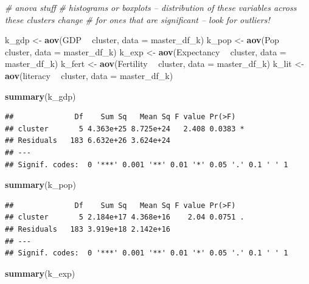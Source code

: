 \documentclass[]{article}
\newenvironment{Shaded}{\begin{snugshade}}{\end{snugshade}}
\newcommand{\CommentTok}[1]{\textcolor[rgb]{0.56,0.35,0.01}{\textit{#1}}}
\newcommand{\DataTypeTok}[1]{\textcolor[rgb]{0.13,0.29,0.53}{#1}}
\newcommand{\KeywordTok}[1]{\textcolor[rgb]{0.13,0.29,0.53}{\textbf{#1}}}
\newcommand{\NormalTok}[1]{#1}
\newcommand{\OperatorTok}[1]{\textcolor[rgb]{0.81,0.36,0.00}{\textbf{#1}}}
\newcommand{\StringTok}[1]{\textcolor[rgb]{0.31,0.60,0.02}{#1}}
\begin{document}
\begin{Shaded}
\begin{Highlighting}[]
\CommentTok{# anova stuff}
\CommentTok{# histograms or boxplots -- distribution of these variables across these clusters change}
\CommentTok{# for ones that are significant -- look for outliers!}

\NormalTok{k_gdp <-}\StringTok{ }\KeywordTok{aov}\NormalTok{(GDP }\OperatorTok{~}\StringTok{ }\NormalTok{cluster, }\DataTypeTok{data =}\NormalTok{ master_df_k)}
\NormalTok{k_pop <-}\StringTok{ }\KeywordTok{aov}\NormalTok{(Pop }\OperatorTok{~}\StringTok{ }\NormalTok{cluster, }\DataTypeTok{data =}\NormalTok{ master_df_k) }
\NormalTok{k_exp <-}\StringTok{ }\KeywordTok{aov}\NormalTok{(Expectancy }\OperatorTok{~}\StringTok{ }\NormalTok{cluster, }\DataTypeTok{data =}\NormalTok{ master_df_k) }
\NormalTok{k_fert <-}\StringTok{ }\KeywordTok{aov}\NormalTok{(Fertility }\OperatorTok{~}\StringTok{ }\NormalTok{cluster, }\DataTypeTok{data =}\NormalTok{ master_df_k) }
\NormalTok{k_lit <-}\StringTok{ }\KeywordTok{aov}\NormalTok{(literacy }\OperatorTok{~}\StringTok{ }\NormalTok{cluster, }\DataTypeTok{data =}\NormalTok{ master_df_k) }

\KeywordTok{summary}\NormalTok{(k_gdp)}
\end{Highlighting}
\end{Shaded}

\begin{verbatim}
##              Df    Sum Sq   Mean Sq F value Pr(>F)  
## cluster       5 4.363e+25 8.725e+24   2.408 0.0383 *
## Residuals   183 6.632e+26 3.624e+24                 
## ---
## Signif. codes:  0 '***' 0.001 '**' 0.01 '*' 0.05 '.' 0.1 ' ' 1
\end{verbatim}

\begin{Shaded}
\begin{Highlighting}[]
\KeywordTok{summary}\NormalTok{(k_pop)}
\end{Highlighting}
\end{Shaded}

\begin{verbatim}
##              Df    Sum Sq   Mean Sq F value Pr(>F)  
## cluster       5 2.184e+17 4.368e+16    2.04 0.0751 .
## Residuals   183 3.919e+18 2.142e+16                 
## ---
## Signif. codes:  0 '***' 0.001 '**' 0.01 '*' 0.05 '.' 0.1 ' ' 1
\end{verbatim}

\begin{Shaded}
\begin{Highlighting}[]
\KeywordTok{summary}\NormalTok{(k_exp)}
\end{Highlighting}
\end{Shaded}
\end{document}
